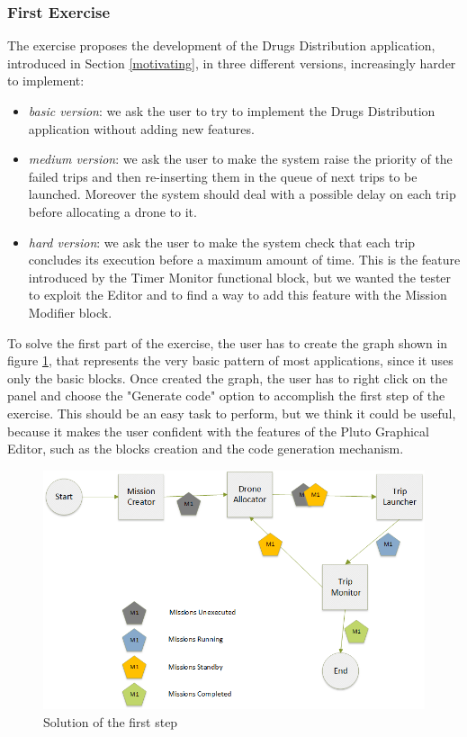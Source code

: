 \subsubsection{First Exercise}

The exercise proposes the development of the Drugs Distribution application, introduced in Section \ref{motivating}, in three different versions, increasingly harder to implement:

\begin{itemize}
\itemsep2pt
\item{
\textit{basic version}: we ask the user to try to implement the Drugs Distribution application without adding new features.
}
\item{
\textit{medium version}: we ask the user to make the system raise the priority of the failed trips and then re-inserting them in the queue of next trips to be launched. Moreover the system  should deal with a possible delay on each trip before allocating a drone to it.
}
\item{
\textit{hard version}: we ask the user to make the system check that each trip concludes its execution before a maximum amount of time. This is the feature introduced by the Timer Monitor functional block, but we wanted the tester to exploit the Editor and to find a way to add this feature with the Mission Modifier block.
}
\end{itemize}

To solve the first part of the exercise, the user has to create the graph shown in figure \ref{fig:firstStep}, that represents the very basic pattern of most applications, since it uses only the basic blocks.
Once created the graph, the user has to right click on the panel and choose the "Generate code" option to accomplish the first step of the exercise.
This should be an easy task to perform, but we think it could be useful, because it makes the user confident with the features of the Pluto Graphical Editor, such as the blocks creation and the code generation mechanism.
\\

 \begin{figure}[htb]
   \centering
   \includegraphics[width=\linewidth]{pictures/firstStep.png}
   \caption{Solution of the first step}
   \label{fig:firstStep}
 \end{figure}

